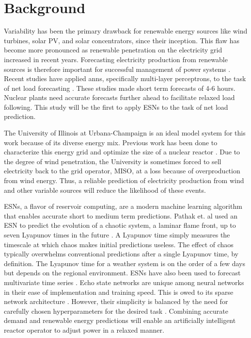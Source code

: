 \section{Background}
Variability has been the primary drawback for renewable energy sources like
wind turbines, solar PV, and solar concentrators, since their inception. This
flaw has become more pronounced as renewable penetration on the electricity
grid increased in recent years. Forecasting electricity production from
renewable sources is therefore important for successful management of power
systems \cite{kobylinski_high-resolution_2020}. Recent studies have applied
\glspl{ann}, specifically multi-layer perceptrons, to the task of net load
forecasting \cite{kobylinski_high-resolution_2020,dutta_load_2017,lee_development_2016}. These studies made short
term forecasts of 4-6 hours. Nuclear plants
need accurate forecasts further ahead to facilitate relaxed load following.
This study will be the first to apply \glspl{ESN} to the task of net load
prediction.

The University of Illinois at Urbana-Champaign is an ideal model system for
this work because of its diverse energy mix. Previous work has been done to
characterize this energy grid and optimize the size of a nuclear reactor
\cite{dotson_optimal_2020}. Due to the degree of wind penetration, the
University is sometimes
forced to sell electricity back to the grid operator, MISO, at a loss because
of overproduction
from wind energy. Thus, a reliable prediction of electricity production from
wind and other variable sources will reduce the likelihood of these events.

\glspl{ESN}, a flavor of reservoir computing, are a modern
machine learning algorithm that enables accurate short
to medium term predictions. Pathak et. al used an \gls{ESN} to predict the
evolution of a chaotic system, a laminar flame front, up to seven Lyapunov
times in the future \cite{pathak_model-free_2018, wikner_combining_2020}. A
Lyapunov time simply measures the timescale at which chaos makes initial
predictions useless. The effect of chaos typically overwhelms conventional
predictions after a single Lyapunov time, by definition.
The Lyapunov time for a weather system is on the order of a few days but
depends on the regional environment. \glspl{ESN} have also been used to
forecast multivariate time series \cite{bianchi_reservoir_2020}. Echo state
networks are unique among neural
networks in their ease of implementation and training speed. This is owed to its
sparse network architecture \cite{pathak_model-free_2018,
wikner_combining_2020, vannitsem_predictability_2017}. However,
their simplicity is balanced by the need for carefully chosen hyperparameters
for the desired task \cite{lukosevicius_practical_2012}.
Combining accurate demand and
renewable energy predictions will enable an artificially intelligent reactor
operator to adjust power in a relaxed manner.
